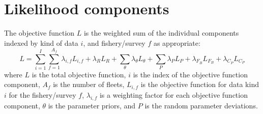 \section{Likelihood components}

The objective function $L$ is the weighted sum of the individual components
indexed by kind of data $i$, and fishery/survey $f$ as appropriate:
\begin{equation}
	L = \sum_{i=1}^{I}\sum_{f=1}^{A_f}\lambda_{i,f} L_{i,f}+\lambda_R L_R + 
	  \sum_{\theta}^{}\lambda_\theta L_\theta + \sum_{P}^{}\lambda_P L_P +
	  \lambda_{F_B} L_{F_B} + \lambda_{C_P} L_{C_P}
\end{equation}
where $L$ is the total objective function, $i$ is the index of the objective
function component, $A_f$ is the number of fleets, $L_{i,f}$ is the
objective function for data kind $i$ for the fishery/survey $f$,
$\lambda_{i,f}$ is a weighting factor for each objective function component,
$\theta$ is the parameter priors, and $P$ is the random parameter deviations.

